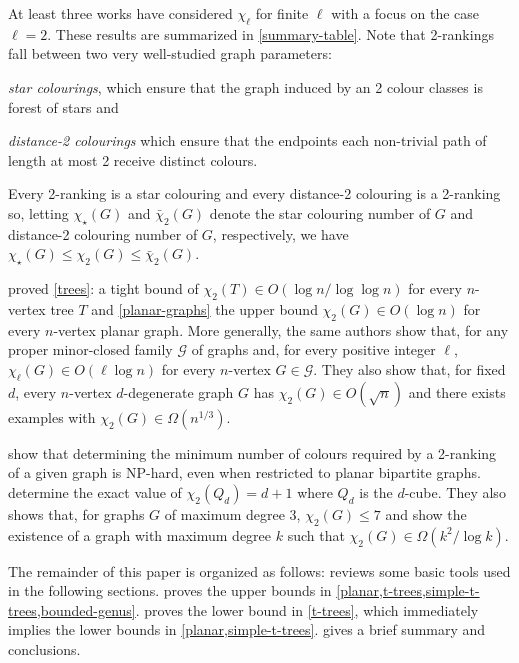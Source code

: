 \documentclass[kpfonts]{patmorin}
\newcommand{\trn}{\chi_2}
\newcommand{\dtcn}{\bar{\chi}_2}
\newcommand{\scn}{\chi_{\star}}
\theoremstyle{named}
\begin{document}
At least three works have considered $\chi_\ell$ for finite $\ell$ with a focus on the case $\ell=2$.  These results are summarized in \cref{summary-table}.  Note that 2-rankings fall between two very well-studied graph parameters:
\begin{compactitem}
    \item \emph{star colourings}, which ensure that the graph induced by an 2 colour classes is forest of stars and
    \item \emph{distance-2 colourings} which ensure that the endpoints each non-trivial path of length at most 2 receive distinct colours.
\end{compactitem}
Every 2-ranking is a star colouring and every distance-2 colouring is a 2-ranking so, letting $\scn(G)$ and $\dtcn(G)$ denote the star colouring number of $G$ and distance-2 colouring number of $G$, respectively, we have $\scn(G) \le \trn(G)\le \dtcn(G)$.

\citet{karpas.neiman.ea:on} proved \cref{trees}: a tight bound of $\trn(T)\in O(\log n/\log\log n)$ for every $n$-vertex tree $T$ and \cref{planar-graphs} the upper bound $\trn(G)\in O(\log n)$ for every $n$-vertex planar graph.  More generally, the same authors show that, for any proper minor-closed family $\mathcal{G}$ of graphs and, for every positive integer $\ell$, $\chi_\ell(G)\in O(\ell\log n)$ for every $n$-vertex $G\in\mathcal{G}$.  They also show that, for fixed $d$, every $n$-vertex $d$-degenerate graph $G$ has $\trn(G)\in O(\sqrt{n})$ and there exists examples with $\trn(G)\in\Omega(n^{1/3})$.

\citet{shalu.antony:complexity} show that determining the minimum number of colours required by a 2-ranking of a given graph is NP-hard, even when restricted to planar bipartite graphs.  \citet{almeter.demircan.ea:graph} determine the exact value of $\trn(Q_d)=d+1$ where $Q_d$ is the $d$-cube.  They also shows that, for graphs $G$ of maximum degree 3, $\trn(G)\le 7$ and show the existence of a graph with maximum degree $k$ such that $\trn(G)\in\Omega(k^2/\log k)$.

The remainder of this paper is organized as follows:  reviews some basic tools used in the following sections.  proves the upper bounds in \cref{planar,t-trees,simple-t-trees,bounded-genus}.   proves the lower bound in \cref{t-trees}, which immediately implies the lower bounds in \cref{planar,simple-t-trees}.  gives a brief summary and conclusions.
\end{document}
